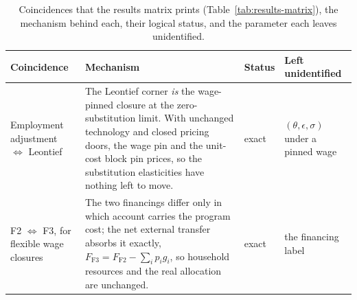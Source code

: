 \begin{table}[htbp]
\centering
\footnotesize
\setlength{\tabcolsep}{5pt}
\renewcommand{\arraystretch}{1.25}
\begin{tabular}{@{}>{\raggedright\arraybackslash}p{3.3cm}
                  >{\raggedright\arraybackslash}p{5.5cm}
                  >{\raggedright\arraybackslash}p{2.1cm}
                  >{\raggedright\arraybackslash}p{2.8cm}@{}}
\toprule
Coincidence & Mechanism & Status & Left unidentified \\
\midrule
Employment adjustment $\Leftrightarrow$ Leontief
& The Leontief corner \emph{is} the wage-pinned closure at the
  zero-substitution limit. With unchanged technology and closed pricing
  doors, the wage pin and the unit-cost block pin prices, so the
  substitution elasticities have nothing left to move.
& exact
& $(\theta,\epsilon,\sigma)$ under a pinned wage \\[3pt]
F2 $\Leftrightarrow$ F3, for flexible wage closures
& The two financings differ only in which account carries the program
  cost; the net external transfer absorbs it exactly,
  $F_{\mathrm{F3}} = F_{\mathrm{F2}} - \sum_i p_i g_i$, so household resources
  and the real allocation are unchanged.
& exact
& the financing label \\
\bottomrule
\end{tabular}
\caption{Coincidences that the results matrix prints
(Table~\ref{tab:results-matrix}), the mechanism behind each, their logical
status, and the parameter each leaves unidentified.}
\label{tab:equiv-matrix}
\end{table}
